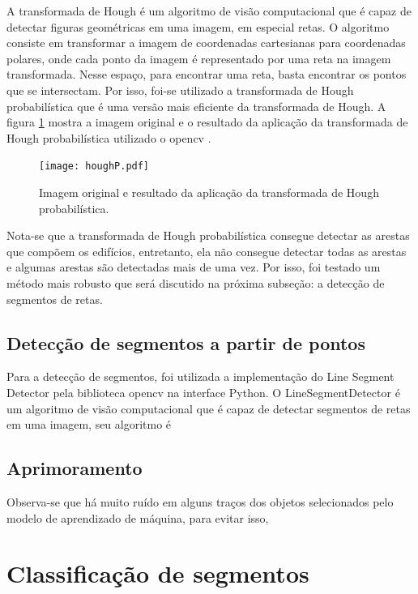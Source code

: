 \documentclass[12pt]{article}
\begin{document}
A transformada de Hough \cite{illingworth1988survey} é um algoritmo de visão computacional que é capaz de detectar figuras geométricas em uma imagem, em especial retas. O algoritmo consiste em transformar a imagem de coordenadas cartesianas para coordenadas polares, onde cada ponto da imagem é representado por uma reta na imagem transformada. Nesse espaço, para encontrar uma reta, basta encontrar os pontos que se intersectam. Por isso, foi-se utilizado a transformada de Hough probabilística \cite{matas2000robust} que é uma versão mais eficiente da transformada de Hough. A figura \ref{fig:hough} mostra a imagem original e o resultado da aplicação da transformada de Hough probabilística utilizado o opencv \cite{opencv_hough}.


\begin{figure}
\centering
\texttt{[image: houghP.pdf]}
\caption{Imagem original e resultado da aplicação da transformada de Hough probabilística.}
\label{fig:hough}
\end{figure}

Nota-se que a transformada de Hough probabilística consegue detectar as arestas que compõem os edifícios, entretanto, ela não consegue detectar todas as arestas e algumas arestas são detectadas mais de uma vez. Por isso, foi testado um método mais robusto que será discutido na próxima subseção: a detecção de segmentos de retas.

\subsection{Detecção de segmentos a partir de pontos}

Para a detecção de segmentos, foi utilizada a implementação do Line Segment Detector \cite{opencv_manual} pela biblioteca opencv \cite{opencv_library} na interface Python. O LineSegmentDetector é um algoritmo de visão computacional que é capaz de detectar segmentos de retas em uma imagem, seu algoritmo é 


\subsection{Aprimoramento}

Observa-se que há muito ruído em alguns traços dos objetos selecionados pelo modelo de aprendizado de máquina, para evitar isso,  


\section{Classificação de segmentos}
\end{document}
